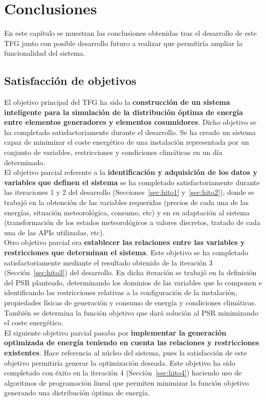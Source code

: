 \chapter{Conclusiones}
\label{cap:Conclusiones}
En este capítulo se muestran las conclusiones obtenidas tras el desarrollo de este \gls{TFG} junto con posible desarrollo futuro a realizar que permitiría ampliar la funcionalidad del sistema.\\
\section{Satisfacción de objetivos}
El objetivo principal del \gls{TFG} ha sido la \textbf{construcción de un sistema inteligente para la simulación de la distribución óptima de energía entre elementos generadores y elementos cosumidores}. Dicho objetivo se ha completado satisfactoriamente durante el desarrollo. Se ha creado un sistema capaz de minimizar el coste energético de una instalación representada por un conjunto de variables, restricciones y condiciones climáticas en un día determinado.\\

El objetivo parcial referente a la \textbf{identificación y adquisición de los datos y variables que definen el sistema} se ha completado satisfactoriamente durante las iteraciones 1 y 2 del desarrollo (Secciones~\ref{sec:hito1} y~\ref{sec:hito2}), donde se trabajó en la obtención de las variables requeridas (precios de cada una de las energías, situación meteorológica, consumo, etc) y en su adaptación al sistema (transformación de los estados meteorológicos a valores discretos, tratado de cada una de las APIs utilizadas, etc).\\

Otro objetivo parcial era \textbf{establecer las relaciones entre las variables y restricciones que determinan el sistema}. Este objetivo se ha completado satisfactoriamente mediante el resultado obtenido de la iteración 3 (Sección~\ref{sec:hito3}) del desarrollo. En dicha iteración se trabajó en la definición del \gls{PSR} planteado, determinando los dominios de las variables que lo componen e identificando las restricciones relativas a la configuración de la instalación, propiedades físicas de generación y consumo de energía y condiciones climáticas. También se determina la función objetivo que dará solución al \gls{PSR} minimizando el coste energético.\\

El siguiente objetivo parcial pasaba por \textbf{implementar la generación optimizada de energía teniendo en cuenta las relaciones y restricciones existentes}. Hace referencia al núcleo del sistema, pues la satisfacción de este objetivo permitiría generar la optimización deseada. Este objetivo ha sido completado con éxito en la iteración 4 (Sección~\ref{sec:hito4}) haciendo uso de algoritmos de programación lineal que permiten minimizar la función objetivo generando una distribución óptima de energía.\\

